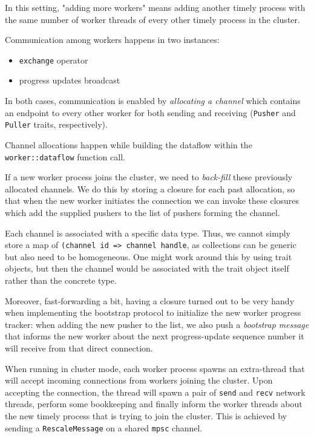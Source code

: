 \documentclass[12pt]{extarticle}
\begin{document}
In this setting, "adding more workers" means adding another timely process with the same number of worker threads
of every other timely process in the cluster.

Communication among workers happens in two instances:
\begin{itemize}
    \item \verb|exchange| operator
    \item progress updates broadcast
\end{itemize}

In both cases, communication is enabled by \textit{allocating a channel} which contains an endpoint to every other worker
for both sending and receiving (\verb|Pusher| and \verb|Puller| traits, respectively).

Channel allocations happen while building the dataflow within the \verb|worker::dataflow| function call.

If a new worker process joins the cluster, we need to \textit{back-fill} these previously allocated channels.
We do this by storing a closure for each past allocation, so that when the new worker initiates the connection
we can invoke these closures which add the supplied pushers to the list of pushers forming the channel.

Each channel is associated with a specific data type.
Thus, we cannot simply store a map of \verb|(channel id => channel handle|, as collections can be generic but also need to be homogeneous.
One might work around this by using trait objects, but then the channel would be associated with the trait object itself rather than the concrete
type.

Moreover, fast-forwarding a bit, having a closure turned out to be very handy when implementing the bootstrap protocol to initialize the new worker
progress tracker: when adding the new pusher to the list, we also push a \textit{bootstrap message} that informs the new worker about the next
progress-update sequence number it will receive from that direct connection.


\vspace{3mm}
\noindent
When running in cluster mode, each worker process spawns an extra-thread that will accept incoming connections from workers joining the cluster.
Upon accepting the connection, the thread will spawn a pair of \verb|send| and \verb|recv| network threads, perform some bookkeeping and
finally inform the worker threads about the new timely process that is trying to join the cluster.
This is achieved by sending a \verb|RescaleMessage| on a shared \verb|mpsc| channel.
\end{document}
